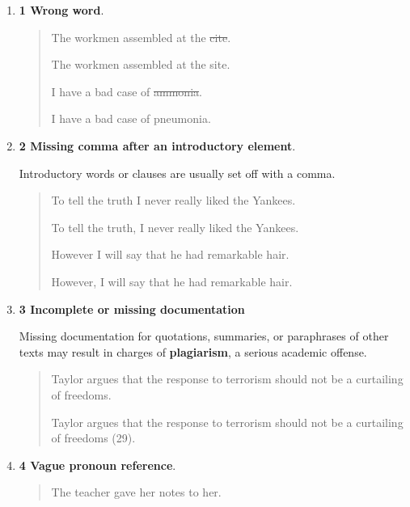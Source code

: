 \begin{enumerate}

\item \textbf{1 Wrong word}.

\begin{quote}
The workmen assembled at the \sout{cite}.      

The workmen assembled at the site.      

\medskip

I have a bad case of \sout{ammonia}.     

I have a bad case of pneumonia.     
\end{quote}

\item \textbf{2 Missing comma after an introductory element}.

Introductory words or clauses are usually set off with a comma. 

\begin{quote}

To tell the truth I never really liked the Yankees.  

To tell the truth, I never really liked the Yankees.  

\medskip

However I will say that he had remarkable hair.  

However, I will say that he had remarkable hair.  
\end{quote}

\item \textbf{3 Incomplete or missing documentation}

Missing documentation for quotations, summaries, or paraphrases of other texts may result in charges
of \textbf{plagiarism}, a serious academic offense.

\begin{quote}
Taylor argues that the response to terrorism should not be a curtailing of freedoms. 

\medskip

Taylor argues that the response to terrorism should not be a curtailing of freedoms (29). 
\end{quote}

\item \textbf{4 Vague pronoun reference}.

\begin{quote}
The teacher gave her notes to her.  


\end{quote}
\end{enumerate}
